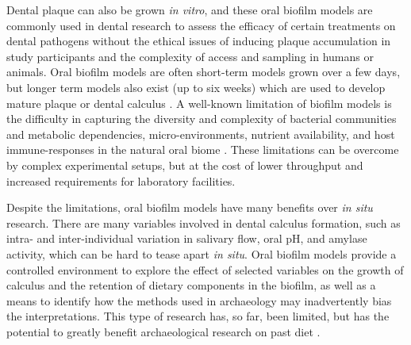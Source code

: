 \documentclass[10pt,a4paper]{article}
\begin{document}
Dental plaque can also be grown \emph{in vitro}, and these oral biofilm
models are commonly used in dental research to assess the efficacy of
certain treatments on dental pathogens
\citep{filochePlaqueMicrocosm2007, extercateAAA2010} without the ethical
issues of inducing plaque accumulation in study participants and the
complexity of access and sampling in humans or animals. Oral biofilm
models are often short-term models grown over a few days, but longer
term models also exist (up to six weeks) which are used to develop
mature plaque or dental calculus
\citep{middletonVitroCalculus1965, sissonsMultistationPlaque1991, wongCalciumPhosphate2002, velskoConsistentReproducible2018}.
A well-known limitation of biofilm models is the difficulty in capturing
the diversity and complexity of bacterial communities and metabolic
dependencies, micro-environments, nutrient availability, and host
immune-responses in the natural oral biome
\citep{edlundUncoveringComplex2018, bjarnsholtVivoBiofilm2013, velskoConsistentReproducible2018, velskoCytokineResponse2017}.
These limitations can be overcome by complex experimental setups, but at
the cost of lower throughput and increased requirements for laboratory
facilities.

Despite the limitations, oral biofilm models have many benefits over
\emph{in situ} research. There are many variables involved in dental
calculus formation, such as intra- and inter-individual variation in
salivary flow, oral pH, and amylase activity, which can be hard to tease
apart \emph{in situ}. Oral biofilm models provide a controlled
environment to explore the effect of selected variables on the growth of
calculus and the retention of dietary components in the biofilm, as well
as a means to identify how the methods used in archaeology may
inadvertently bias the interpretations. This type of research has, so
far, been limited, but has the potential to greatly benefit
archaeological research on past diet \citep{radiniDirtyTeeth2022}.
\end{document}
